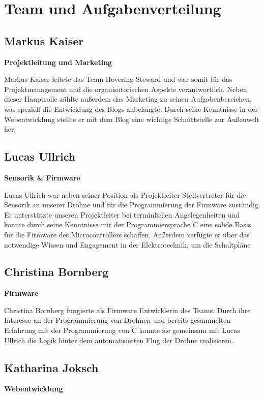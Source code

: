 \section{Team und Aufgabenverteilung}
  \subsection*{Markus Kaiser}
  \textbf{Projektleitung und Marketing}

  Markus Kaiser leitete das Team Hovering Steward und war somit für das Projektmanagement und
  die organisatorischen Aspekte verantwortlich. Neben dieser Hauptrolle zählte außerdem das Marketing
  zu seinen Aufgabenbereichen, was speziell die Entwicklung des Blogs anbelangte. Durch seine Kenntnisse
  in der Webentwicklung stellte er mit dem Blog eine wichtige Schnittstelle zur Außenwelt her.

  \subsection*{Lucas Ullrich}
  \textbf{Sensorik \& Firmware}

  Lucas Ullrich war neben seiner Position als Projektleiter Stellvertreter für die Sensorik an unserer Drohne und
  für die Programmierung der Firmware zuständig. Er unterstützte unseren Projektleiter bei terminlichen Angelegenheiten
  und konnte durch seine Kenntnisse mit der Programmiersprache C eine solide Basis für die Firmware des Microcontrollers schaffen.
  Außerdem verfügte er über das notwendige Wissen und Engagement in der Elektrotechnik, um die Schaltpläne

  \subsection*{Christina Bornberg}
  \textbf{Firmware}

  Christina Bornberg fungierte als Firmware Entwicklerin des Teams. Durch ihre Interesse an der Programmierung von Drohnen
  und bereits gesammelten Erfahrung mit der Programmierung von C konnte sie gemeinsam mit Lucas Ullrich die Logik hinter
  dem automatisierten Flug der Drohne realisieren.

  \subsection*{Katharina Joksch}
  \textbf{Webentwicklung}

